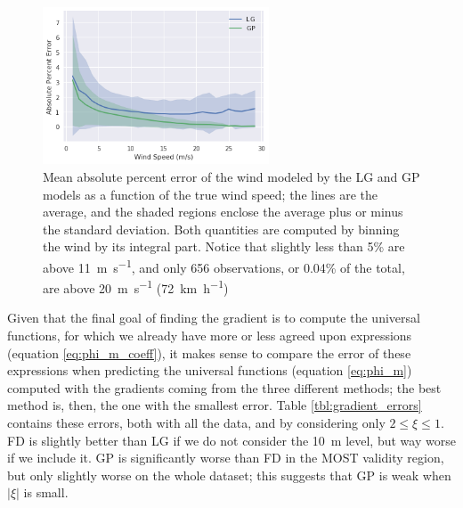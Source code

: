 \documentclass[a4paper]{book}
\begin{document}
\begin{figure}
    \centering
	\includegraphics[width=0.6\textwidth]{images/gp_log_perc_err_wind_speed}
	\caption{Mean absolute percent error of the wind modeled by the LG and GP models as a function of the true wind speed; the lines are the average, and the shaded regions enclose the average plus or minus the standard deviation. Both quantities are computed by binning the wind by its integral part. Notice that slightly less than 5\% are above \SI{11}{\meter\per\second}, and only 656 observations, or 0.04\% of the total, are above \SI{20}{\meter\per\second} (\SI{72}{\kilo\meter\per\hour})}
	\label{fig:gp_log_perc_err_wind_speed}
\end{figure}


Given that the final goal of finding the gradient is to compute the universal functions, for which we already have more or less agreed upon expressions (equation \ref{eq:phi_m_coeff}), it makes sense to compare the error of these expressions when predicting the universal functions (equation \ref{eq:phi_m}) computed with the gradients coming from the three different methods; the best method is, then, the one with the smallest error. Table \ref{tbl:gradient_errors} contains these errors, both with all the data, and by considering only $2\leq\xi\leq 1$. FD is slightly better than LG if we do not consider the \SI{10}{\meter} level, but way worse if we include it. GP is significantly worse than FD in the MOST validity region, but only slightly worse on the whole dataset; this suggests that GP is weak when $\vert\xi\vert$ is small. 
\end{document}
